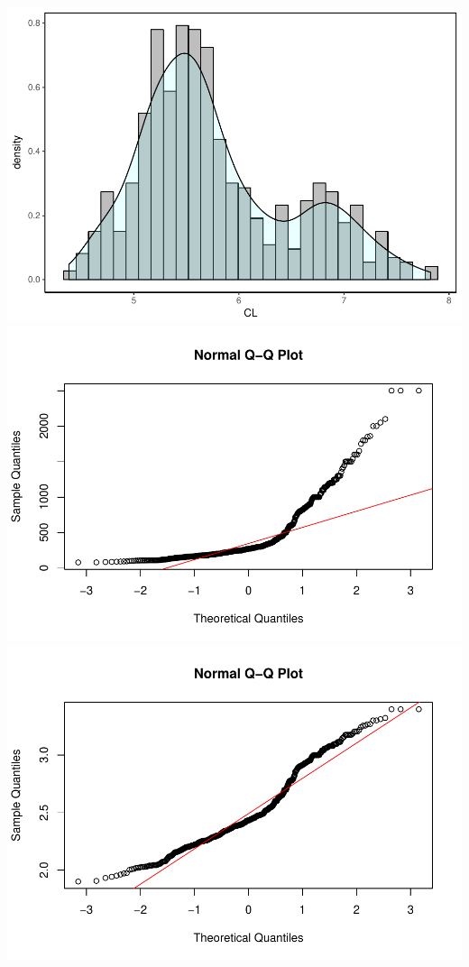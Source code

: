 \documentclass[]{article}
\begin{document}
\includegraphics{MA_JJ_files/figure-latex/HistAll-1.pdf}
\includegraphics{MA_JJ_files/figure-latex/normalDistribution-1.pdf}
\includegraphics{MA_JJ_files/figure-latex/normalDistribution-2.pdf}
\end{document}
